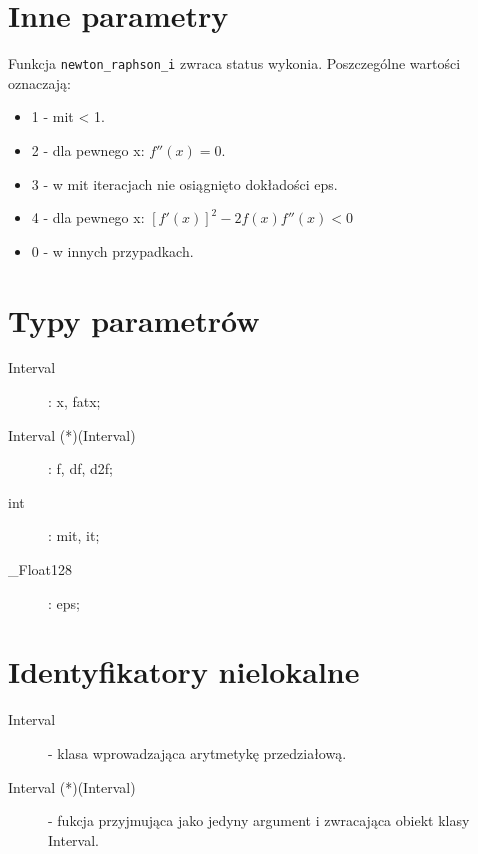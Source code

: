 \documentclass[11pt]{article}
\begin{document}
\section{Inne parametry}
    Funkcja \verb|newton_raphson_i| zwraca status wykonia. 
    Poszczególne wartości oznaczają:
    \begin{itemize}
        \item 1 - mit < 1.
        \item 2 - dla pewnego x: $f''(x) = 0$.
        \item 3 - w mit iteracjach nie osiągnięto dokładości eps.
        \item 4 - dla pewnego x: $[f'(x)]^2 -2f(x)f''(x) < 0$
        \item 0 - w innych przypadkach.
    \end{itemize}
\section{Typy parametrów}
    \begin{description}
        \item[Interval]: x, fatx; 
        \item[Interval (*)(Interval)]: f, df, d2f;
        \item[int]: mit, it;
        \item[\_Float128]: eps;
    \end{description}
\section{Identyfikatory nielokalne}
    \begin{description}
        \item[Interval] - klasa wprowadzająca arytmetykę przedziałową.
        \item[Interval (*)(Interval)] - fukcja przyjmująca jako jedyny argument i zwracająca obiekt klasy Interval.
    \end{description}
\pagebreak
\end{document}
